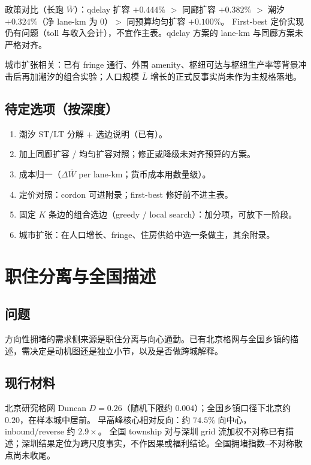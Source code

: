 \documentclass[11pt,a4paper]{article}
\begin{document}
政策对比（长跑 $\bar W$）：qdelay 扩容 $+0.444\%$ $>$ 同廊扩容 $+0.382\%$ $>$ 潮汐 $+0.324\%$（净 lane-km 为 $0$）$>$ 同预算均匀扩容 $+0.100\%$。
First-best 定价实现仍有问题（toll 与收入会计），不宜作主表。qdelay 方案的 lane-km 与同廊方案未严格对齐。

城市扩张相关：已有 fringe 通行、外围 amenity、枢纽可达与枢纽生产率等背景冲击后再加潮汐的组合实验；人口规模 $\bar L$ 增长的正式反事实尚未作为主规格落地。

\subsection*{待定选项（按深度）}
\begin{enumerate}[nosep]
  \item 潮汐 ST/LT 分解 + 选边说明（已有）。
  \item 加上同廊扩容 / 均匀扩容对照；修正或降级未对齐预算的方案。
  \item 成本归一（$\Delta\bar W$ per lane-km；货币成本用数量级）。
  \item 定价对照：cordon 可进附录；first-best 修好前不进主表。
  \item 固定 $K$ 条边的组合选边（greedy / local search）：加分项，可放下一阶段。
  \item 城市扩张：在人口增长、fringe、住房供给中选一条做主，其余附录。
\end{enumerate}

\section{职住分离与全国描述}

\subsection*{问题}
方向性拥堵的需求侧来源是职住分离与向心通勤。已有北京格网与全国乡镇的描述，需决定是动机图还是独立小节，以及是否做跨城解释。

\subsection*{现行材料}
北京研究格网 Duncan $D=0.26$（随机下限约 $0.004$）；全国乡镇口径下北京约 $0.20$，在样本城中居前。
早高峰核心相对反向：约 $74.5\%$ 向中心，inbound/reverse 约 $2.9\times$。
全国 township 对与深圳 grid 流加权不对称已有描述；深圳结果定位为跨尺度事实，不作因果或福利结论。全国拥堵指数--不对称散点尚未收尾。
\end{document}
